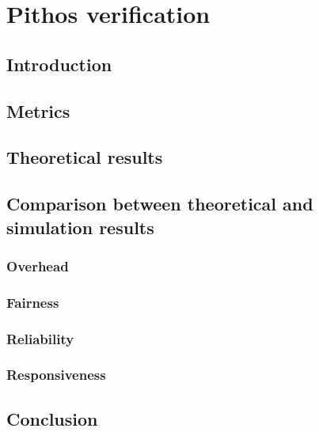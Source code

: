 \chapter{Pithos verification}
    \label{chp:VERIFICATION}

\section{Introduction}
    \section{Metrics}

    \section{Theoretical results}

    \section{Comparison between theoretical and simulation results}

        \subsection{Overhead}
        \subsection{Fairness}
        \subsection{Reliability}
        \subsection{Responsiveness}
        
\section{Conclusion}